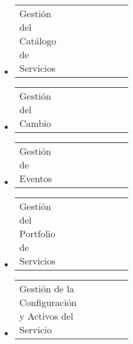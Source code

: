 \documentclass[a4paper]{exam}
\begin{document}
\begin{questions}
\begin{itemize}
    \item \begin{tabular}{p{0.4\linewidth} l}
    Gestión del Catálogo de Servicios & 
    \end{tabular}

    \item \begin{tabular}{p{0.4\linewidth} l}
    Gestión del Cambio & 
    \end{tabular}

    \item \begin{tabular}{p{0.4\linewidth} l}
    Gestión de Eventos &
    \end{tabular}

    \item \begin{tabular}{p{0.4\linewidth} l}
    Gestión del Portfolio de Servicios & 
    \end{tabular}

    \item \begin{tabular}{p{0.4\linewidth} l}
    Gestión de la Configuración y Activos del Servicio & 
    \end{tabular}

  \end{itemize}

  
\end{questions}
\end{document}

